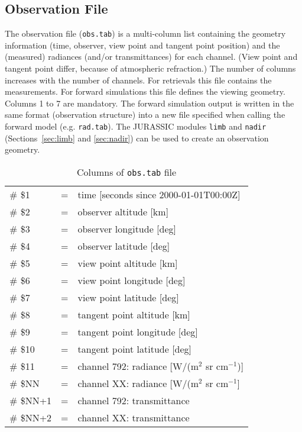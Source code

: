 
\subsection{Observation File}
\label{sec:ObservationFile}
The observation file (\texttt{obs.tab}) is a multi-column list containing the geometry information (time, observer, view point and tangent point position) and the (measured) radiances (and/or transmittances) for each channel. (View point and tangent point differ, because of atmospheric refraction.) The number of columns increases with the number of channels. For retrievals this file contains the measurements. For forward simulations this file defines the viewing geometry. Columns 1 to 7 are mandatory. The forward simulation output is written in the same format (observation structure) into a new file specified when calling the forward model (e.g. \texttt{rad.tab}). The JURASSIC modules \texttt{limb} and \texttt{nadir} (Sections~\ref{sec:limb} and \ref{sec:nadir}) can be used to create an observation geometry.

\begin{table*}[!h]
\caption{Columns of \texttt{obs.tab} file}
\begin{tabular}{lcl}
\# \$1 & = & time [seconds since 2000-01-01T00:00Z] \\
\# \$2 & = & observer altitude [km] \\
\# \$3 & = & observer longitude [deg] \\
\# \$4 & = & observer latitude [deg] \\
\# \$5 & = & view point altitude [km] \\
\# \$6 & = & view point longitude [deg] \\
\# \$7 & = & view point latitude [deg] \\
\# \$8 & = & tangent point altitude [km] \\
\# \$9 & = & tangent point longitude [deg] \\
\# \$10 & = & tangent point latitude [deg] \\
\# \$11 & = & channel 792: radiance [W/(m$^2$ sr cm$^{-1}$)] \\
\# \$NN & = & channel XX: radiance [W/(m$^2$ sr cm$^{-1}$] \\
\# \$NN+1 & = & channel 792: transmittance \\
\# \$NN+2 & = & channel XX: transmittance \\
\end{tabular}
\end{table*} 

